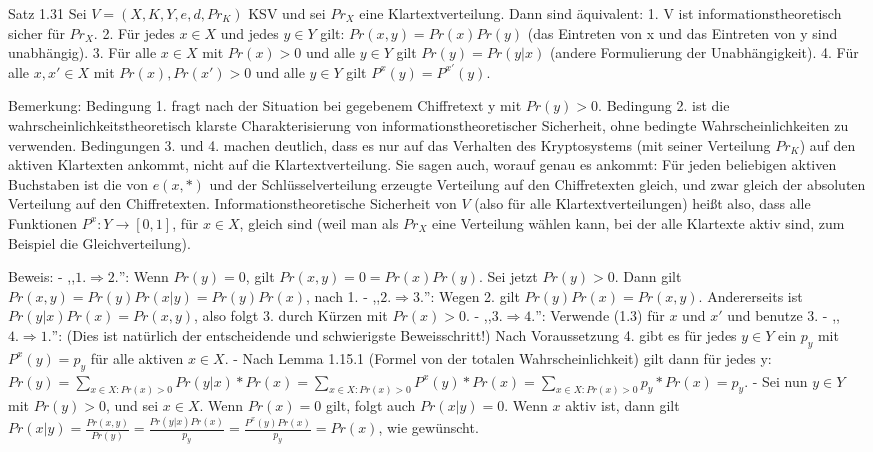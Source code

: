 \documentclass[a4paper]{article}
\begin{document}
\begin{multicols}{3}
    Satz 1.31 Sei $V=(X,K,Y,e,d,Pr_K)$ KSV und sei $Pr_X$ eine Klartextverteilung. Dann sind äquivalent:
    1. V ist informationstheoretisch sicher für $Pr_X$.
    2. Für jedes $x\in X$ und jedes $y\in Y$ gilt: $Pr(x,y)=Pr(x)Pr(y)$ (das Eintreten von x und das Eintreten von y sind unabhängig).
    3. Für alle $x\in X$ mit $Pr(x)>0$ und alle $y\in Y$ gilt $Pr(y)=Pr(y|x)$ (andere Formulierung der Unabhängigkeit).
    4. Für alle $x,x'\in X$ mit $Pr(x),Pr(x')>0$ und alle $y\in Y$ gilt $P^x(y)=P^{x'}(y)$.

    Bemerkung: Bedingung 1. fragt nach der Situation bei gegebenem Chiffretext y mit $Pr(y)>0$. Bedingung 2. ist die wahrscheinlichkeitstheoretisch klarste Charakterisierung von informationstheoretischer Sicherheit, ohne bedingte Wahrscheinlichkeiten zu verwenden. Bedingungen 3. und 4. machen deutlich, dass es nur auf das Verhalten des Kryptosystems (mit seiner Verteilung $Pr_K$) auf den aktiven Klartexten ankommt, nicht auf die Klartextverteilung. Sie sagen auch, worauf genau es ankommt: Für jeden beliebigen aktiven Buchstaben ist die von $e(x,*)$ und der Schlüsselverteilung erzeugte Verteilung auf den Chiffretexten gleich, und zwar gleich der absoluten Verteilung auf den Chiffretexten. Informationstheoretische Sicherheit von $V$ (also für alle Klartextverteilungen) heißt also, dass alle Funktionen $P^x:Y\rightarrow [0,1]$, für $x\in X$, gleich sind (weil man als $Pr_X$ eine Verteilung wählen kann, bei der alle Klartexte aktiv sind, zum Beispiel die Gleichverteilung).

    Beweis:
    - ,,$1.\Rightarrow 2.$'': Wenn $Pr(y)=0$, gilt $Pr(x,y)=0=Pr(x)Pr(y)$. Sei jetzt $Pr(y)>0$. Dann gilt $Pr(x,y)=Pr(y)Pr(x|y) = Pr(y)Pr(x)$, nach 1.
    - ,,$2.\Rightarrow 3.$'': Wegen 2. gilt $Pr(y)Pr(x)=Pr(x,y)$. Andererseits ist $Pr(y|x)Pr(x)=Pr(x,y)$, also folgt 3. durch Kürzen mit $Pr(x)>0$.
    - ,,$3.\Rightarrow 4.$'': Verwende (1.3) für $x$ und $x'$ und benutze 3.
    - ,,$4.\Rightarrow 1.$'': (Dies ist natürlich der entscheidende und schwierigste Beweisschritt!) Nach Voraussetzung 4. gibt es für jedes $y\in Y$ ein $p_y$ mit $P^x(y)=p_y$ für alle aktiven $x\in X$.
    - Nach Lemma 1.15.1 (Formel von der totalen Wahrscheinlichkeit) gilt dann für jedes y: $Pr(y)=\sum_{x\in X:Pr(x)>0} Pr(y|x)*Pr(x) = \sum_{x\in X: Pr(x)>0} P^x(y)*Pr(x) = \sum_{x\in X:Pr(x)>0} p_y*Pr(x) =p_y$.
    - Sei nun $y\in Y$ mit $Pr(y)>0$, und sei $x\in X$. Wenn $Pr(x)=0$ gilt, folgt auch $Pr(x|y)=0$. Wenn $x$ aktiv ist, dann gilt $Pr(x|y)=\frac{Pr(x,y)}{Pr(y)}=\frac{Pr(y|x)Pr(x)}{p_y}=\frac{P^x(y)Pr(x)}{p_y}=Pr(x)$, wie gewünscht.


\end{multicols}
\end{document}
